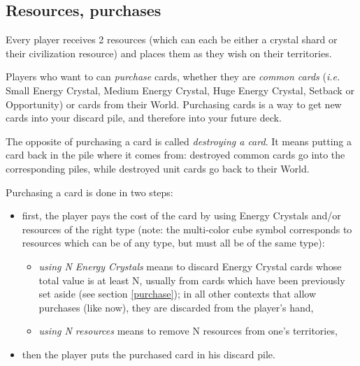 \documentclass[a4paper]{article}
\begin{document}
        
    \subsection{Resources, purchases}
        \label{how-to-purchase}
        Every player receives 2 resources (which can each be either a crystal shard
        or their civilization resource) and places them as they wish on their territories.
        
        Players who want to can \textit{purchase} cards,
        whether they are \textit{common cards} (\textit{i.e.} Small Energy Crystal,
        Medium Energy Crystal, Huge Energy Crystal, Setback or Opportunity)
        or cards from their World.
        Purchasing cards is a way to get new cards into your discard pile,
        and therefore into your future deck.
        
        The opposite of  purchasing a card is called \textit{destroying a card}.
        It means putting a card back in the pile where it comes from:
        destroyed common cards go into the corresponding piles,
        while destroyed unit cards go back to their World.

\newpage
        Purchasing a card is done in two steps:
        \vspace{-1.3em}
        \begin{itemize}
            \item first, the player pays the cost of the card by using Energy Crystals
                and/or resources of the right type
                (note: the multi-color cube symbol corresponds to resources
                which can be of any type, but must all be of the same type):
                \vspace{-0.5em}
                \begin{itemize}
                    \item \textit{using N Energy Crystals} means to discard Energy Crystal
                        cards whose total value is at least N,
                        usually from cards which have been previously set aside
                        (see section \ref{purchase});
                        in all other contexts that allow purchases (like now),
                        they are discarded from the player's hand,
                    \item \textit{using N resources} means to remove N resources
                        from one's territories,
                \end{itemize}
            \item then the player puts the purchased card in his discard pile.
        \end{itemize}
        
\end{document}
